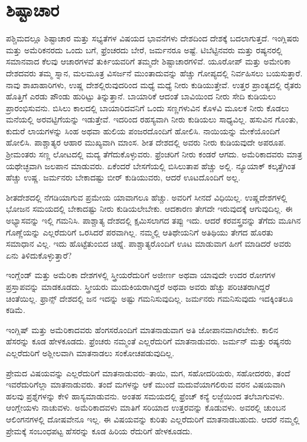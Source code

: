 \section{ಶಿಷ್ಟಾಚಾರ}

ಪಶ್ಚಿಮದಲ್ಲೂ ಶಿಷ್ಟಾಚಾರ ಮತ್ತು ಸಭ್ಯತೆಗಳ ವಿಷಯದ ಭಾವನೆಗಳು ದೇಶದಿಂದ ದೇಶಕ್ಕೆ ಬದಲಾಗುತ್ತದೆ. ಇಂಗ್ಲಿಷರು ಮತ್ತು ಅಮೆರಿಕನರದು ಒಂದು ಬಗೆ, ಫ್ರೆಂಚರದು ಬೇರೆ, ಜರ್ಮನರೂ ಅಷ್ಟೆ. ಟಿಬೆಟ್ಟಿನವರು ಮತ್ತು ರಷ್ಯನರಲ್ಲಿ ಸಮಾನವಾದ ಕೆಲವು ಆಚಾರಗಳವೆ ತುರ್ಕಿಯವರಿಗೆ ತಮ್ಮದೇ ಶಿಷ್ಟಾಚಾರಗಳಿವೆ. ಯೂರೋಪ್​ ಮತ್ತು ಅಮೇರಿಕಾ ದೇಶದವರು ತಮ್ಮ ಸ್ನಾನ, ಮಲಮೂತ್ರ ವಿಸರ್ಜನೆ ಮುಂತಾದುವನ್ನು ಹೆಚ್ಚು ಗೋಪ್ಯದಲ್ಲಿ ನಿರ್ವಹಿಸಲು ಬಯಸುತ್ತಾರೆ. ನಾವು ಶಾಖಾಹಾರಿಗಳು, ಉಷ್ಣ ದೇಶಲ್ಲಿರುವುದರಿಂದ ಮಧ್ಯೆ ಮಧ್ಯೆ ನೀರು ಕುಡಿಯುತ್ತೇವೆ. ಉತ್ತರ ಪ್ರಾಂತ್ಯದಲ್ಲಿ ರೈತರು ಹೊತ್ತಿಗೆ ಎರಡು ಪೌಂಡು ಹುರಿಟ್ಟು ತಿನ್ನುತ್ತಾನೆ. ಬಾಯಾರಿಕೆ ಆದಂತೆ ಬಾವಿಯಿಂದ ನೀರು ಸೇದಿ ಕುಡಿಯಲು ಪ್ರಾರಂಭಿಸುವನು. ಬಿಸಿಲು ಕಾಲದಲ್ಲಿ ಬಾಯಾರಿದವನಿಗೆ ಒಂದು ಸಣ್ಣಗಳುವಿನ ಕೊಳವಿ ಮೂಲಕ ನೀರು ಕೊಡಲು ಮನೆಯಲ್ಲಿ ಅರವಟ್ಟಿಗೆಯನ್ನು ಇಡುತ್ತೇವೆ. ಇದರಿಂದ ರಹಸ್ಯವಾಗಿ ನೀರು ಕುಡಿಯಲು ಸಾಧ್ಯವಿಲ್ಲ. ಹಸುವಿನ ಗೊಂತು, ಕುದುರೆ ಲಾಯಗಳನ್ನು ಸಿಂಹ ಅಥವಾ ಹುಲಿಯ ಪಂಜರದೊಂದಿಗೆ ಹೋಲಿಸಿ. ನಾಯಿಯನ್ನು ಮೇಕೆಯೊಂದಿಗೆ ಹೋಲಿಸಿ. ಪಾಶ್ಚಾತ್ಯರ ಆಹಾರ ಮುಖ್ಯವಾಗಿ ಮಾಂಸ. ಶೀತ ದೇಶದಲ್ಲಿ ಅವರು ನೀರು ಕುಡಿಯವುದೇ ಅಪರೂಪ. ಶ‍್ರೀಮಂತರು ಸಣ್ಣ ಲೋಟದಲ್ಲಿ ಮದ್ಯ ತೆಗೆದುಕೊಳ್ಳುವರು. ಫ್ರೆಂಚರಿಗೆ ನೀರು ಕಂಡರೆ ಆಗದು. ಅಮೆರಿಕಾದವರು ಮಾತ್ರ ಯಥೇಚ್ಛವಾಗಿ ಜಲಪಾನ ಮಾಡುವರು. ಏಕೆಂದರೆ ಬೇಸಗೆಯಲ್ಲಿ ಬಿಸಿಲುತಾಪ ಹೆಚ್ಚು ಅಲ್ಲಿ. ನ್ಯೂಯಾಕ್​ ಕಲ್ಕತ್ತೆಗಿಂತ ಹೆಚ್ಚು ಉಷ್ಣ. ಜರ್ಮನರು ಬೇಕಾದಷ್ಟು ಬೀರ್​ ಕುಡಿಯುವರು, ಆದರೆ ಊಟದೊಂದಿಗೆ ಅಲ್ಲ.

ಶೀತದೇಶದಲ್ಲಿ ನೆಗಡಿಯಾಗುವ ಪ್ರಮೇಯ ಯಾವಾಗಲೂ ಹೆಚ್ಚು. ಅವರಿಗೆ ಸೀನದೆ ವಿಧಿಯಿಲ್ಲ. ಉಷ್ಣದೇಶಗಳಲ್ಲಿ ಭೋಜನ ಸಮಯದಲ್ಲಿ ಬೇಕಾದಷ್ಟು ನೀರು ಕುಡಿಯಲೇಬೇಕು. ಆದಕಾರಣ ತೇಗದೇ ಇರುವುದಕ್ಕೆ ಆಗುವುದಿಲ್ಲ. ಈ ಅಭ್ಯಾಸವನ್ನು ಇಲ್ಲಿ ಗಮನಿಸಿ. ಪಾಶ್ಚಾತ್ಯ ದೇಶದಲ್ಲಿ ಕ್ಷಮಿಸಲಾಗದ ತಪ್ಪು ಇದು. ಆದರೆ ಕರವಸ್ತ್ರವನ್ನು ತೆಗೆದು ಮೂಗಿನ ಗೊಣ್ಣೆಯನ್ನು ಎಲ್ಲರೆದುರಿಗೆ ಒರಸಿದರೆ ಪರವಾಗಿಲ್ಲ. ನಮ್ಮಲ್ಲಿ ಆತಿಥೇಯನಿಗೆ ಅತಿಥಿಯು ತೇಗದ ಹೊರತು ಸಮಾಧಾನ ವಿಲ್ಲ. ಇದು ಹೊಟ್ಟೆತುಂಬಿದ ಚಿಹ್ನೆ. ಪಾಶ್ಚಾತ್ಯರೊಂದಿಗೆ ಊಟ ಮಾಡುವಾಗ ಹೀಗೆ ಮಾಡಿದರೆ ಅವರು ಏನು ತಿಳಿದುಕೊಳ್ಳುತ್ತಾರೆ?

ಇಂಗ್ಲೆಂಡ್​ ಮತ್ತು ಅಮೆರಿಕಾ ದೇಶಗಳಲ್ಲಿ ಸ್ತ್ರೀಯರೆದುರಿಗೆ ಅಜೀರ್ಣ ಅಥವಾ ಯಾವುದೇ ಉದರ ರೋಗಗಳ ಪ್ರಸ್ತಾಪವನ್ನು ಮಾಡಕೂಡದು. ಸ್ತ್ರೀಯರು ಮುದುಕಿಯರಾಗಿದ್ದರೆ ಅಥವಾ ಅವರು ಹೆಚ್ಚು ಪರಿಚಿತರಾಗಿದ್ದರೆ ಚಿಂತೆಯಿಲ್ಲ. ಫ್ರಾನ್ಸ್​ ದೇಶದಲ್ಲಿ ಜನ ಇದನ್ನು ಅಷ್ಟು ಗಮನಿಸುವುದಿಲ್ಲ. ಜರ್ಮನರು ಗಮನಿಸುವುದು ಇದಕ್ಕಿಂತಲೂ ಕಡಿಮೆ.

ಇಂಗ್ಲಿಷ್​ ಮತ್ತು ಅಮೆರಿಕಾದವರು ಹೆಂಗಸರೊಂದಿಗೆ ಮಾತನಾಡುವಾಗ ಅತಿ ಜೋಪಾನವಾಗಿರಬೇಕು. ಕಾಲಿನ ಹೆಸರನ್ನು ಕೂಡ ಹೇಳಕೂಡದು. ಫ್ರೆಂಚರು ನಮ್ಮಂತೆ ಎಲ್ಲರೆದುರಿಗೆ ಮಾತನಾಡುವರು. ಜರ್ಮನ್​ ಮತ್ತು ರಷ್ಯನರು ಎಲ್ಲರೆದುರಿಗೆ ಅಶ್ಲೀಲವಾಗಿ ಮಾತನಾಡಲು ಸಂಕೋಚಪಡುವುದಿಲ್ಲ.

ಪ್ರೇಮದ ವಿಷಯವನ್ನು ಎಲ್ಲರೆದುರಿಗೆ ಮಾತನಾಡುವರು–ತಾಯಿ, ಮಗ, ಸಹೋದರಿಯರು, ಸಹೋದರರು, ತಂದೆ ಇವರೆದುರಿಗೆಲ್ಲಾ ಮಾತನಾಡುವರು. ತಂದೆ ಮಗಳನ್ನು ಆಕೆ ಮುಂದೆ ಮದುವೆಯಾಗಲಿರುವ ವರನ ವಿಷಯವಾಗಿ ಹಲವು ಪ್ರಶ್ನೆಗಳನ್ನು ಕೇಳಿ ಹಾಸ್ಯಮಾಡುವನು. ಅಂತಹ ಸಮಯದಲ್ಲಿ ಫ್ರೆಂಚ್​ ಕನ್ಯೆ ಲಜ್ಜೆಯಿಂದ ತಲೆಬಾಗುವಳು. ಆಂಗ್ಲೇಯಳು ನಾಚುವಳು. ಅಮೆರಿಕಾದವಳು ಮಾತಿಗೆ ಸರಿಯಾದ ಉತ್ತರವನ್ನು ಕೊಡುವಳು. ಅವರಲ್ಲಿ ಚುಂಬನ ಆಲಿಂಗನಗಳಲ್ಲಿ ದೋಷವೇನೂ ಇಲ್ಲ. ಈ ವಿಷಯವನ್ನು ಕುರಿತು ಎಲ್ಲರೆದುರಿಗೆ ಮಾತನಾಡಬಹುದು. ಆದರೆ ನಮ್ಮಲ್ಲಿ ಪ್ರೇಮಕ್ಕೆ ಸಂಬಂಧಪಟ್ಟ ಹೆಸರನ್ನು ಕೂಡ ಹಿರಿಯ ರೆದುರಿಗೆ ಹೇಳಕೂಡದು.

